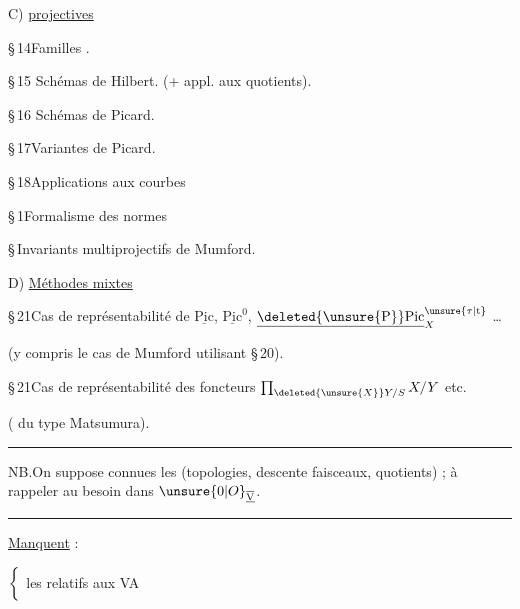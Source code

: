 \clearpage
{}

C) \uline{  projectives}

\S\,14\quad Familles .

\S\,15\quad {} Schémas de Hilbert. (+ appl. aux quotients).

\S\,16\quad {} Schémas de Picard.

\S\,17\quad Variantes de Picard.

\S\,18\quad Applications aux courbes

\S\,1\quad Formalisme des normes

\S\,\quad Invariants multiprojectifs de Mumford.

D) \uline{Méthodes  mixtes}

\S\,21\quad Cas de représentabilité de $\underline{\mathrm{Pic}}$, $\underline{\mathrm{Pic}}^{0}$, $\underline{\deleted{\unsure{\mathrm P}}\mathrm{Pic}}_{X}^{\unsure{\tau|\mathrm t}}$ \ldots

(y compris le cas de Mumford utilisant \S\,20).

\S\,21\quad Cas de représentabilité des foncteurs $\prod_{\deleted{\unsure{X}}Y/S}X/Y$ etc.

( du type Matsumura).

\noindent\rule{\linewidth}{.3pt}

NB.\quad On suppose connues  les   (topologies, descente faisceaux, quotients) ; à rappeler au besoin dans $\unsure{0|O}_{\underline{\overline{\mathrm V}}}$.

\noindent\rule{\linewidth}{.3pt}

\uline{Manquent} :

\reversemarginpar{}
$\left\{\vphantom{\begin{matrix}a\\a\end{matrix}}\right.$ les  relatifs aux VA

